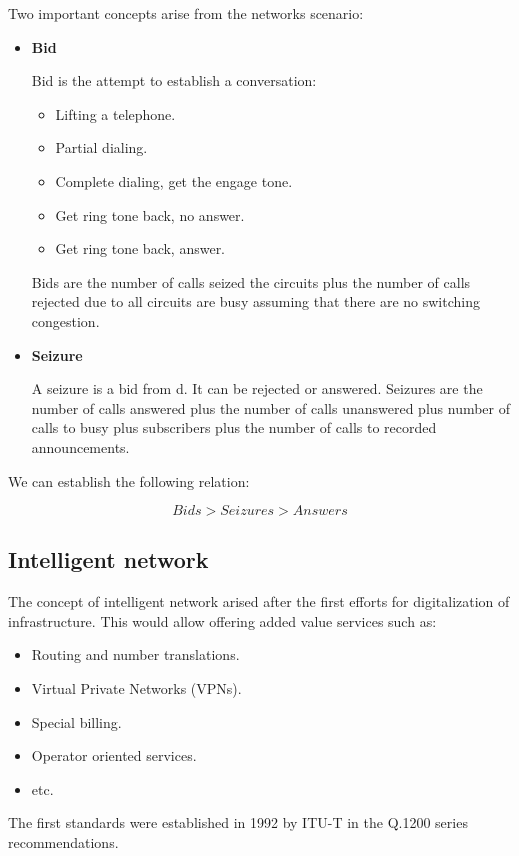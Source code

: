 \documentclass[
	12pt,
	twoside
]{book}
\begin{document}
Two important concepts arise from the networks scenario:

\begin{itemize}
	\item {
		\textbf{Bid}

		Bid is the attempt to establish a conversation:

		\begin{itemize}
			\item Lifting a telephone.
			\item Partial dialing.
			\item Complete dialing, get the engage tone.
			\item Get ring tone back, no answer.
			\item Get ring tone back, answer.
		\end{itemize}

		Bids are the number of calls seized the circuits plus the number of calls rejected due to all circuits are busy assuming that there are no switching congestion.
	}
	\item {
		\textbf{Seizure}

		A seizure is a bid from d. It can be rejected or answered. Seizures are the number of calls answered plus the number of calls unanswered plus number of calls to busy plus subscribers plus the number of calls to recorded announcements.
	}
\end{itemize}

We can establish the following relation:

$$
	Bids > Seizures > Answers
$$

\subsection{Intelligent network}

The concept of intelligent network arised after the first efforts for digitalization of infrastructure. This would allow offering added value services such as:

\begin{itemize}
	\item Routing and number translations.
	\item Virtual Private Networks (VPNs).
	\item Special billing.
	\item Operator oriented services.
	\item etc.
\end{itemize}

The first standards were established in 1992 by ITU-T in the Q.1200 series recommendations.
\end{document}
